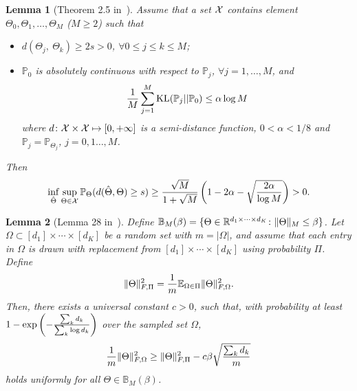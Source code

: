 \documentclass{article}
\theoremstyle{plain}
\newtheorem{lem}{Lemma}
\theoremstyle{definition}
\begin{document}
\begin{lem}[Theorem 2.5 in~\cite{tsybakov2008introduction}]\label{lem:Tsybakov}
Assume that a set $\mathcal{X}$ contains element $\Theta_0, \Theta_1, \ldots,\Theta_M$ ($M\geq 2$) such that
\begin{itemize}
\item $d(\Theta_j,\ \Theta_k)\geq 2s>0$, $\forall 0\leq j\leq k\leq M$;
\item $\mathbb{P}_0$ is absolutely continuous with respect to $\mathbb{P}_j$, $\forall j=1,\ldots,M$, and
\[
{1\over M}\sum_{j=1}^M \mathrm{KL}(\mathbb{P}_j||\mathbb{P}_0)\leq \alpha \log M
\]
where $d\colon \mathcal{X}\times \mathcal{X}\mapsto [0,+\infty]$ is a semi-distance function, $0<\alpha<{1/8}$ and $\mathbb{P}_j=\mathbb{P}_{\Theta_j}$, $j=0,1\ldots,M$.
\end{itemize}
Then
\[
\inf_{\hat \Theta}\sup_{\Theta\in\mathcal{X}} \mathbb{P}_{\Theta}(d(\hat \Theta, \Theta)\geq s)\geq {\sqrt{M}\over 1+\sqrt{M}}\left(1-2\alpha-\sqrt{2\alpha\over \log M} \right)>0.
\]
\end{lem}

\begin{lem}[Lemma 28 in~\cite{ghadermarzy2019near}]\label{lem:convexity}
Define $\mathbb{B}_{M}(\beta)=\{\Theta\in \mathbb{R}^{d_1\times \cdots \times d_K}\colon \lVert\Theta\rVert_M\leq \beta \}$.  Let $\Omega\subset[d_1]\times\cdots \times [d_K]$ be a random set with $m=|\Omega|$, and assume that each entry in $\Omega$ is drawn with replacement from $[d_1]\times\cdots\times[d_K]$ using probability $\Pi$. Define
\[
\lVert\Theta\rVert_{F,\Pi}^2={1\over m}\mathbb{E}_{\Omega\in\Pi}\lVert\Theta\rVert_{F,\Omega}^2.
\]
Then, there exists a universal constant $c>0$, such that, with probability at least $1-\exp\left(-{\sum_kd_k \over \sum_k \log d_k} \right)$ over the sampled set $\Omega$,
\[
{1\over m}\lVert\Theta\rVert_{F,\Omega}^2 \geq \lVert\Theta\rVert_{F,\Pi}^2-c\beta\sqrt{\sum_k d_k\over m}
\]
holds uniformly for all $\Theta\in\mathbb{B}_M(\beta)$.
\end{lem}
\end{document}
